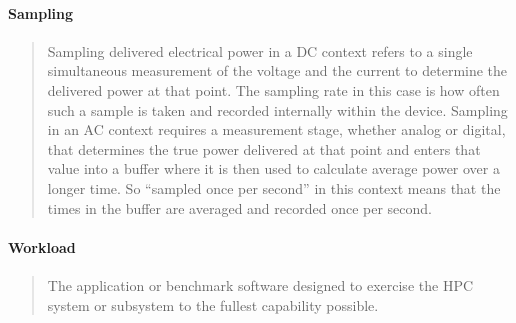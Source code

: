 \paragraph*{Sampling}
\begin{quote}
Sampling delivered electrical power in a DC context refers to a single simultaneous measurement
of the voltage and the current to determine the delivered power at that point.  The sampling
rate in this case is how often such a sample is taken and recorded internally within the device.
Sampling in an AC context requires a measurement stage, whether analog or digital, that determines
the true power delivered at that point and enters that value into a buffer where it is then used
to calculate average power over a longer time.  So ``sampled once per second'' in this context
means that the times in the buffer are averaged and recorded once per second.
\end{quote}

\paragraph*{Workload}
\begin{quote}
The application or benchmark software designed to exercise the HPC system or subsystem to
the fullest capability possible.
\end{quote}

